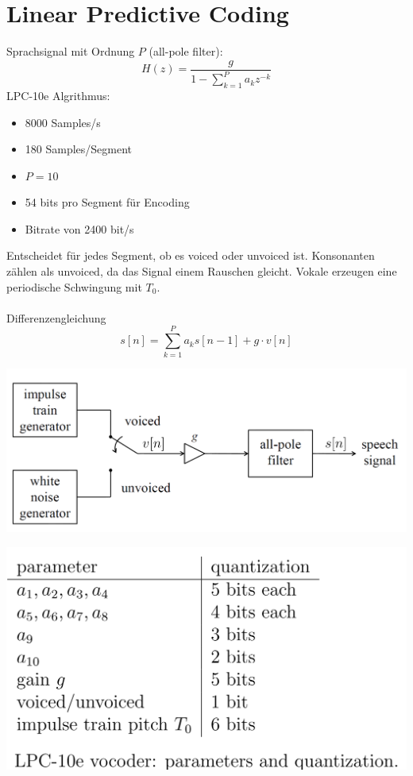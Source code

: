 \section{Linear Predictive Coding}
Sprachsignal mit Ordnung $P$ (all-pole filter):
\[ H(z) = \frac{g}{1-\sum_{k=1}^{P}a_kz^{-k}} \]
LPC-10e Algrithmus:
\begin{itemize}
	\item 8000 Samples/s
	\item 180 Samples/Segment
	\item $P=10$
	\item 54 bits pro Segment für Encoding
	\item Bitrate von 2400 bit/s
\end{itemize}
Entscheidet für jedes Segment, ob es voiced oder unvoiced ist. Konsonanten zählen
als unvoiced, da das Signal einem Rauschen gleicht. Vokale erzeugen eine 
periodische Schwingung mit $T_0$.\\
\\
Differenzengleichung
\[ s[n] = \sum_{k=1}^{P}a_ks[n-1] + g \cdot v[n] \]
\begin{minipage}{.5\textwidth}
\begin{center}
	\includegraphics[width=\textwidth]{../fig/speech_signal}
\end{center}
\end{minipage}
\begin{minipage}{.5\textwidth}
\begin{center}
	\includegraphics[width=\textwidth]{../fig/lpc_10e}
\end{center}
\end{minipage}
